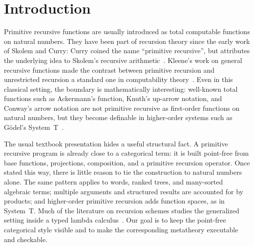 \documentclass[sigplan,10pt,anonymous,review,screen]{acmart}
\begin{document}


\maketitle

\section{Introduction}
\label{sec:introduction}

Primitive recursive functions are usually introduced as total computable
functions on natural numbers.  They have been part of recursion theory
since the early work of Skolem and Curry: Curry coined the name
``primitive recursive'', but attributes the underlying idea to Skolem's
recursive arithmetic~\cite{skolem23,curry41:_formal_recur_arith}.
Kleene's work on general recursive functions made the contrast between
primitive recursion and unrestricted recursion a standard one in
computability theory~\cite{kleene36:_gener_recur_funct_natur_number}.
Even in this classical setting, the boundary is mathematically
interesting: well-known total functions such as Ackermann's function,
Knuth's up-arrow notation, and Conway's arrow notation are not primitive
recursive as first-order functions on natural numbers, but they become
definable in higher-order systems such as G\"odel's
System~T~\cite{szasz1991machine,knuth76:_mathem_comput_scien,conway96:_book_number,DBLP:journals/corr/Widemann16,goedel58}.

The usual textbook presentation hides a useful structural fact.  A
primitive recursive program is already close to a categorical term: it is
built point-free from base functions, projections, composition, and a primitive
recursion operator.  Once stated this way, there is little reason to tie
the construction to natural numbers alone.  The same pattern applies to
words, ranked trees, and many-sorted algebraic terms; multiple arguments
and structured results are accounted for by products; and higher-order
primitive recursion adds function spaces, as in System~T.  Much of the
literature on recursion schemes studies the generalized setting inside a
typed lambda calculus~\cite{DBLP:books/cu/Ha2016,DBLP:conf/fpca/MeijerFP91,DBLP:conf/fpca/MeijerH95}.
Our goal is to keep the point-free categorical style visible and to make
the corresponding metatheory executable and checkable.
\end{document}
